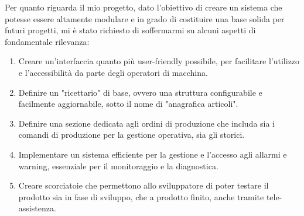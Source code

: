 Per quanto riguarda il mio progetto, dato l'obiettivo di creare un sistema che potesse essere altamente modulare e in grado di costituire una base solida per futuri progetti, mi è stato richiesto di soffermarmi su alcuni aspetti di fondamentale rilevanza:
\begin{enumerate}
    \item Creare un'interfaccia quanto più user-friendly possibile, per facilitare l'utilizzo e l'accessibilità da parte degli operatori di macchina.
    \item Definire un "ricettario" di base, ovvero una struttura configurabile e facilmente aggiornabile, sotto il nome di "anagrafica articoli".
    \item Definire una sezione dedicata agli ordini di produzione che includa sia i comandi di produzione per la gestione operativa, sia gli storici. 
    \item Implementare un sistema efficiente per la gestione e l'accesso agli allarmi e warning, essenziale per il monitoraggio e la diagnostica.
    \item Creare scorciatoie che permettono allo sviluppatore di poter testare il prodotto sia in fase di sviluppo, che a prodotto finito, anche tramite tele-assistenza.
\end{enumerate}

